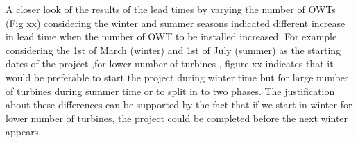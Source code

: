 A closer look of the results of the lead times by varying the number of OWTs (Fig xx) considering the winter and summer seasons indicated different increase in lead time when the number of OWT to be installed increased. For example considering the 1st of March (winter) and 1st of July (summer) as the starting dates of the project ,for lower number of turbines , figure xx indicates that it would be preferable to start the project during winter time but for large number of turbines during summer time or to split in to two phases. The justification about these differences can be supported by the fact that if we start in winter for lower number of turbines, the project could be completed before the next winter appears. 